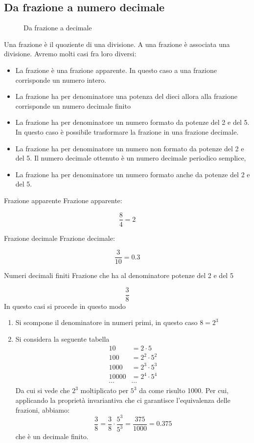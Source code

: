 \subsection{Da frazione a numero decimale}
\begin{figure}
	\centering
	
	\caption{Da frazione a decimale}
	\label{fig:DaFrazioniaDecimale}
\end{figure}
Una frazione è il quoziente di una divisione.  A una frazione è associata una divisione. Avremo molti casi fra loro diversi:
\begin{itemize}
	\item La frazione è una frazione apparente. In questo caso a una frazione corrisponde un numero intero.
	\item La frazione ha per denominatore una potenza del dieci allora alla frazione corrisponde un numero decimale finito  
	\item La frazione ha per denominatore un numero formato da potenze del \num{2} e del \num{5}. In questo caso è possibile trasformare la frazione in una frazione decimale.
	\item La frazione ha per denominatore un numero non formato da potenze del \num{2} e del \num{5}. Il numero decimale ottenuto è un numero decimale periodico semplice, 
	\item La frazione ha per denominatore un numero formato anche da potenze del \num{2} e del \num{5}. 
\end{itemize}
\begin{esempiot}{Frazione apparente}{}
Frazione apparente: 
\end{esempiot}
\[\dfrac{8}{4}=\num{2}\]
\begin{esempiot}{Frazione decimale}{}
Frazione decimale:
\end{esempiot}
\[\dfrac{3}{10}=\num{0.3}\]
\begin{esempiot}{Numeri decimali finiti}{}
	Frazione che ha al denominatore potenze del \num{2} e del \num{5}
\end{esempiot}
\[\dfrac{3}{8}\] In questo casi si procede in questo modo\begin{enumerate}
			\item Si scompone il denominatore in numeri primi, in questo caso $8=2^3$
			\item Si considera la seguente tabella 
			\begin{align*}
			\num{10}&=2\cdot 5\\
			\num{100}&=2^2\cdot 5^2\\
			\num{1000}&=2^3\cdot 5^3\\
			\num{10000}&=2^4\cdot 5^4\\
			\cdots&\cdots
			\end{align*}
			Da cui si vede che $2^3$ moltiplicato per $5^3$ da come risulto \num{1000}. Per cui, applicando la proprietà invariantiva che ci garantisce l'equivalenza delle frazioni, abbiamo:\[\dfrac{3}{8}=\dfrac{3}{8}\cdot\dfrac{5^3}{5^3}=\dfrac{375}{1000}=\num{0,375}\] che è un decimale finito.
		\end{enumerate}
